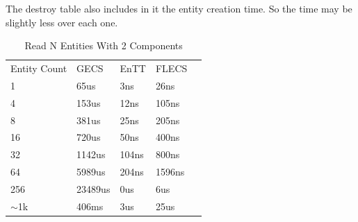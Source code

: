 The destroy table also includes in it the entity creation time. So the time may be slightly less over each one.

\begin{table}[H]
    \centering
    \begin{tabular}{lllll}
    Entity Count & GECS      & EnTT   & FLECS    &  \\
    1            & 65us   & 3ns & 26ns &  \\
    4            & 153us  & 12ns & 105ns &  \\
    8            & 381us  & 25ns & 205ns &  \\
    16           & 720us  & 50ns & 400ns &  \\
    32           & 1142us & 104ns & 800ns &  \\
    64           & 5989us   & 204ns & 1596ns &  \\
    256          & 23489us  & 0us   & 6us   &  \\
    $\sim$1k     & 406ms & 3us  & 25us  & 
    \end{tabular}
    \caption{Read N Entities With 2 Components}    
\end{table}

